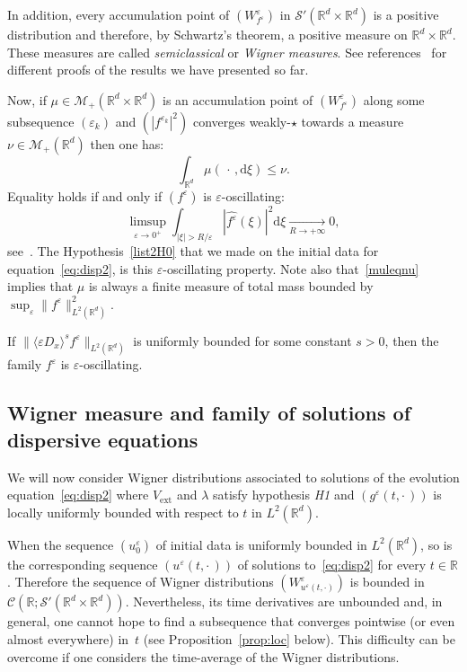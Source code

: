 \documentclass[AHL,Unicode,longabstracts]{cedram}
\DeclareMathOperator{\ext}{ext}
\newcommand*\R{{\mathbb R}}
\newcommand*\eps{\varepsilon}
\numberwithin{equation}{section}
\def\Tend#1#2{\mathop{\longrightarrow}\limits_{#1\rightarrow#2}}
\newcommand*{\dd}{\mathrm{d}}
\newcommand*{\dxi}{\dd \xi}
\begin{document}

In addition, every accumulation point of $(W^\eps_{f^\eps})$ in $\mathcal{S}'(\R^d\times\R^d)$ is a positive distribution and therefore, by Schwartz's theorem, a positive measure on $\R^d\times\R^d$. These measures are called \emph{semiclassical} or \emph{Wigner measures}. See references~\cite{Ge91,GerLeich93,GMMP,LionsPaul} for different proofs of the results we have presented so far.


Now, if $\mu\in\mathcal{M}_+(\R^d\times\R^d)$ is an accumulation point of $(W^\eps_{f^\eps})$ along some subsequence $(\eps_k)$ and $(|f^{\eps_k}|^2)$ converges weakly-$\star$ towards a measure $\nu\in\mathcal{M}_+(\R^d)$ then one has:
\begin{equation}\label{muleqnu}
\int_{\R^d}\mu(\,\cdot\,,\dxi)\leq \nu.
\end{equation}
Equality holds if and only if $(f^\eps)$ is $\eps$-oscillating:
\begin{equation}\label{def:xoscclassical}
\limsup_{\eps\rightarrow 0^+}\int_{|\xi|>R/\eps} | \widehat{f^\eps} (\xi)| ^2 \dxi \Tend{R}{+\infty} 0,
\end{equation}
see~\cite{Ge91,GerLeich93,GMMP}. The Hypothesis~\eqref{list2H0} that we made on the initial data for equation~\eqref{eq:disp2}, is this $\eps$-oscillating property. Note also that~\eqref{muleqnu} implies that $\mu$ is always a finite measure of total mass bounded by $\sup_\eps \|f^\eps\|^2_{L^2(\R^d)}$.

\begin{rema}\label{rem:Hsepsosc}
If $\|\langle \eps D_x\rangle^s f^\eps\|_{L^2(\R^d)}$ is uniformly bounded for some constant $s>0$, then the family $f^\eps$ is $\eps$-oscillating.
\end{rema}



\subsection{Wigner measure and family of solutions of dispersive equations}

We will now consider Wigner distributions associated to solutions of the evolution equation~\eqref{eq:disp2} where $V_{\ext}$ and $\lambda$ satisfy hypothesis \emph{H1} and $(g^\eps(t,\cdot\,))$ is locally uniformly bounded with respect to $t$ in $L^2(\R^d)$.



When the sequence $(u^\eps_0)$ of initial data is uniformly bounded in $L^2(\R^d)$, so is the corresponding sequence $(u^\eps(t,\cdot\,))$ of solutions to~\eqref{eq:disp2} for every $t\in\R$. Therefore the sequence of Wigner distributions $(W^\eps_{u^\eps(t,\cdot)})$ is bounded in $\mathcal{C}(\R;\mathcal{S}'(\R^d\times\R^d))$. Nevertheless, its time derivatives are unbounded and, in general, one cannot hope to find a subsequence that converges pointwise (or even almost everywhere) in~$t$ (see Proposition~\ref{prop:loc} below). This difficulty can be overcome if one considers the time-average of the Wigner distributions.
\end{document}
